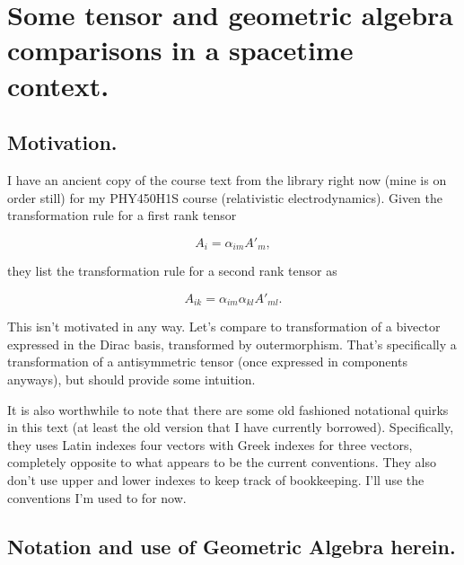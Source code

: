 
%

\chapter{Some tensor and geometric algebra comparisons in a spacetime context.}
\label{chap:antisymmetricTensorTx}
{}
\date{Jan 14, 2011}

\beginArtWithToc

\section{Motivation.}

I have an ancient copy of the course text \cite{landau1951classical} from the library right now (mine is on order still) for my PHY450H1S course (relativistic electrodynamics).  Given the transformation rule for a first rank tensor

\begin{equation}\label{eqn:antisymmetricTensorTx:5}
A_{i} = \alpha_{im} A'_{m},
\end{equation}

they list the transformation rule for a second rank tensor as

\begin{equation}\label{eqn:antisymmetricTensorTx:10}
A_{ik} = \alpha_{im} \alpha_{kl} A'_{ml}.
\end{equation}

This isn't motivated in any way.  Let's compare to transformation of a bivector expressed in the Dirac basis, transformed by outermorphism.  That's specifically a transformation of a antisymmetric tensor (once expressed in components anyways), but should provide some intuition.

It is also worthwhile to note that there are some old fashioned notational quirks in this text (at least the old version that I have currently borrowed).  Specifically, they uses Latin indexes four vectors with Greek indexes for three vectors, completely opposite to what appears to be the current conventions.  They also don't use upper and lower indexes to keep track of bookkeeping.  I'll use the conventions I'm used to for now.

\section{Notation and use of Geometric Algebra herein.}

